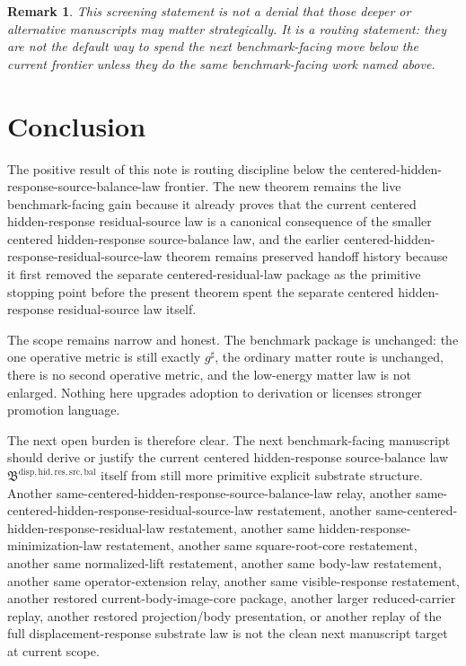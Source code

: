 \documentclass[11pt]{article}
\newcommand{\CompletedMetric}{g^{\sharp}}
\newcommand{\SourceBalanceLawPackage}{\mathfrak B^{\mathrm{disp,hid,res,src,bal}}}
\newtheorem{remark}{Remark}
\begin{document}
\begin{remark}
This screening statement is not a denial that those deeper or alternative manuscripts may matter strategically. It is a routing statement: they are not the default way to spend the next benchmark-facing move below the current frontier unless they do the same benchmark-facing work named above.
\end{remark}

\section{Conclusion}

The positive result of this note is routing discipline below the centered-hidden-response-source-balance-law frontier. The new theorem remains the live benchmark-facing gain because it already proves that the current centered hidden-response residual-source law is a canonical consequence of the smaller centered hidden-response source-balance law, and the earlier centered-hidden-response-residual-source-law theorem remains preserved handoff history because it first removed the separate centered-residual-law package as the primitive stopping point before the present theorem spent the separate centered hidden-response residual-source law itself.

The scope remains narrow and honest. The benchmark package is unchanged: the one operative metric is still exactly \(\CompletedMetric\), the ordinary matter route is unchanged, there is no second operative metric, and the low-energy matter law is not enlarged. Nothing here upgrades adoption to derivation or licenses stronger promotion language.

The next open burden is therefore clear. The next benchmark-facing manuscript should derive or justify the current centered hidden-response source-balance law \(\SourceBalanceLawPackage\) itself from still more primitive explicit substrate structure. Another same-centered-hidden-response-source-balance-law relay, another same-centered-hidden-response-residual-source-law restatement, another same-centered-hidden-response-residual-law restatement, another same hidden-response-minimization-law restatement, another same square-root-core restatement, another same normalized-lift restatement, another same body-law restatement, another same operator-extension relay, another same visible-response restatement, another restored current-body-image-core package, another larger reduced-carrier replay, another restored projection/body presentation, or another replay of the full displacement-response substrate law is not the clean next manuscript target at current scope.
\end{document}
